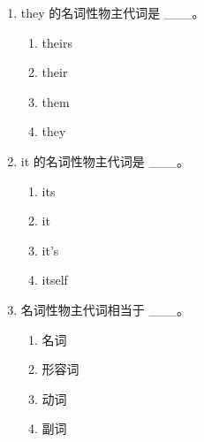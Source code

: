 \documentclass[11pt,a4paper]{ctexart}
\begin{document}
\begin{enumerate}[leftmargin=*,itemsep=4pt]
\item they 的名词性物主代词是 \_\_\_。
\begin{enumerate}[label=\Alph*.,leftmargin=2em,itemsep=1pt,topsep=2pt]
\item theirs
\item their
\item them
\item they
\end{enumerate}
\item it 的名词性物主代词是 \_\_\_。
\begin{enumerate}[label=\Alph*.,leftmargin=2em,itemsep=1pt,topsep=2pt]
\item its
\item it
\item it’s
\item itself
\end{enumerate}
\item 名词性物主代词相当于 \_\_\_。
\begin{enumerate}[label=\Alph*.,leftmargin=2em,itemsep=1pt,topsep=2pt]
\item 名词
\item 形容词
\item 动词
\item 副词
\end{enumerate}
\end{enumerate}
\end{document}
